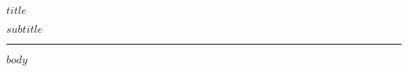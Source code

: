 \documentclass[12pt]{article}
\begin{document}
\vspace*{0.4cm}
\begin{center}
  {\LARGE $title$ \par}
  \vspace{0.25cm}
  {\large\textcolor{muted}{$subtitle$}}
\end{center}
\vspace{0.2cm}
\hrule
\vspace{1.1em}
$body$
\end{document}
